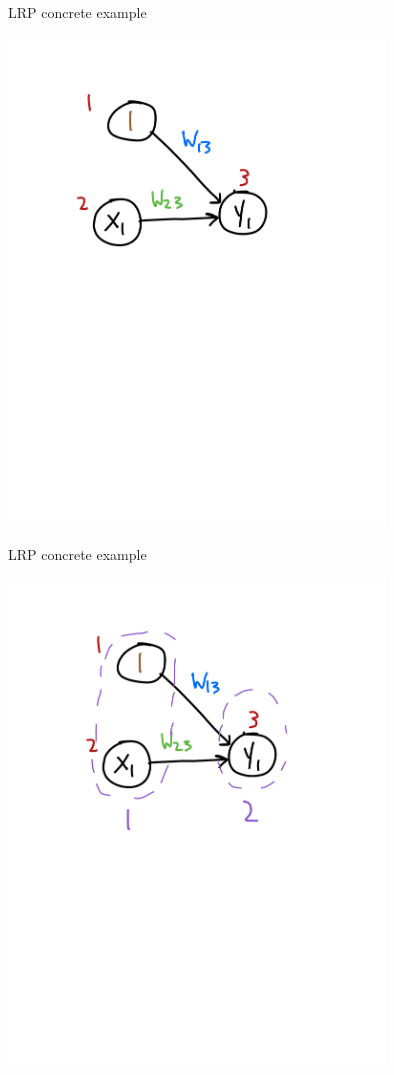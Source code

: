\documentclass[compress]{beamer}
\begin{document}
\begin{frame}{LRP concrete example}
  \begin{center}
    \includegraphics[width=0.75\textwidth]{./figures/lr_nn_4.pdf}
  \end{center}
\end{frame}

\begin{frame}{LRP concrete example}
  \begin{center}
    \includegraphics[width=0.75\textwidth]{./figures/lr_nn_5.pdf}
  \end{center}
\end{frame}
\end{document}
